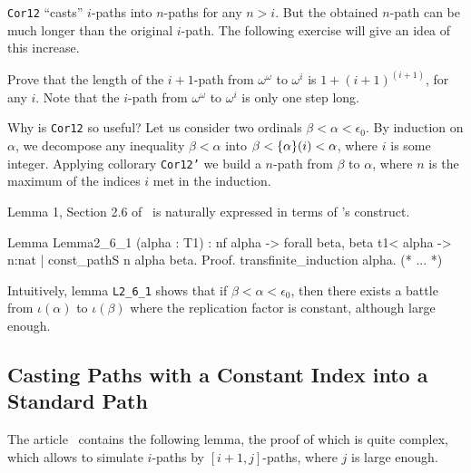 \begin{remark}
 \texttt{Cor12} ``casts'' $i$-paths into $n$-paths for any $n>i$.
But the obtained $n$-path can be much longer than the original $i$-path.
The following exercise will give an idea of this increase. 
\end{remark}

\begin{exercise}
  Prove that  the length of the $i+1$-path from
  $\omega^\omega$ to $\omega^i$ is $1 + (i+1)^{(i+1)}$, for any $i$. Note that the $i$-path from
  $\omega^\omega$ to $\omega^i$ is only one step long.
 \end{exercise}


Why is \texttt{Cor12} so useful? 
Let us  consider two ordinals  $\beta<\alpha<\epsilon_0$. By induction on $\alpha$,
we decompose any inequality $\beta<\alpha$ into $\beta < \mbox{$\{\alpha\}(i)$}< \alpha$, where $i$ is some integer. Applying collorary \texttt{Cor12'} we build a $n$-path from $\beta$ to $\alpha$,
where $n$ is the maximum of the indices $i$ met in the induction.

 Lemma 1, Section 2.6 of~\cite{KS81} is naturally expressed in terms of \coq's
\verb@sig@ construct.

\label{lemma:L-2_6-1}

\begin{Coqsrc}
Lemma Lemma2_6_1 (alpha : T1) :  
  nf alpha -> forall beta,  beta t1< alpha  ->
  {n:nat | const_pathS n alpha beta}.
Proof.
  transfinite_induction alpha.
  (* ... *)
\end{Coqsrc}



Intuitively, lemma   \texttt{L2\_6\_1}  shows that if $\beta<\alpha<\epsilon_0$, then there exists  a battle from $\iota(\alpha)$ to $\iota(\beta)$ where the replication factor is constant, although large enough. 







\subsection{Casting Paths with a Constant Index into a Standard Path}


The article~\cite{KS81} contains 
the following lemma, the proof of which is quite complex, which allows to simulate $i$-paths by $[i+1,j]$-paths, where $j$ is large enough.


